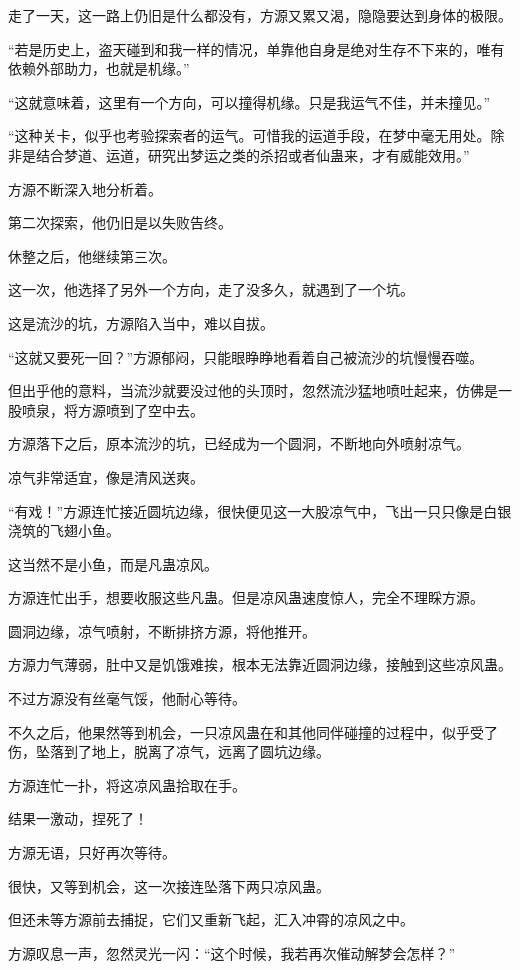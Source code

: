\begin{this_body}
走了一天，这一路上仍旧是什么都没有，方源又累又渴，隐隐要达到身体的极限。

“若是历史上，盗天碰到和我一样的情况，单靠他自身是绝对生存不下来的，唯有依赖外部助力，也就是机缘。”

“这就意味着，这里有一个方向，可以撞得机缘。只是我运气不佳，并未撞见。”

“这种关卡，似乎也考验探索者的运气。可惜我的运道手段，在梦中毫无用处。除非是结合梦道、运道，研究出梦运之类的杀招或者仙蛊来，才有威能效用。”

方源不断深入地分析着。

第二次探索，他仍旧是以失败告终。

休整之后，他继续第三次。

这一次，他选择了另外一个方向，走了没多久，就遇到了一个坑。

这是流沙的坑，方源陷入当中，难以自拔。

“这就又要死一回？”方源郁闷，只能眼睁睁地看着自己被流沙的坑慢慢吞噬。

但出乎他的意料，当流沙就要没过他的头顶时，忽然流沙猛地喷吐起来，仿佛是一股喷泉，将方源喷到了空中去。

方源落下之后，原本流沙的坑，已经成为一个圆洞，不断地向外喷射凉气。

凉气非常适宜，像是清风送爽。

“有戏！”方源连忙接近圆坑边缘，很快便见这一大股凉气中，飞出一只只像是白银浇筑的飞翅小鱼。

这当然不是小鱼，而是凡蛊凉风。

方源连忙出手，想要收服这些凡蛊。但是凉风蛊速度惊人，完全不理睬方源。

圆洞边缘，凉气喷射，不断排挤方源，将他推开。

方源力气薄弱，肚中又是饥饿难挨，根本无法靠近圆洞边缘，接触到这些凉风蛊。

不过方源没有丝毫气馁，他耐心等待。

不久之后，他果然等到机会，一只凉风蛊在和其他同伴碰撞的过程中，似乎受了伤，坠落到了地上，脱离了凉气，远离了圆坑边缘。

方源连忙一扑，将这凉风蛊拾取在手。

结果一激动，捏死了！

方源无语，只好再次等待。

很快，又等到机会，这一次接连坠落下两只凉风蛊。

但还未等方源前去捕捉，它们又重新飞起，汇入冲霄的凉风之中。

方源叹息一声，忽然灵光一闪：“这个时候，我若再次催动解梦会怎样？”


\end{this_body}
